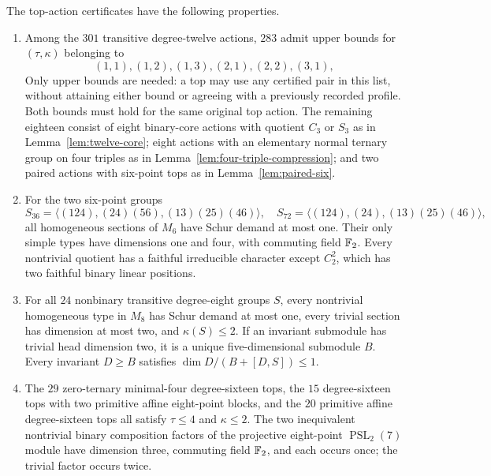 \begin{lemma}\label{lem:small-pair-data}
The top-action certificates have the following properties.
\begin{enumerate}[label=(\roman*)]
\item Among the $301$ transitive degree-twelve actions, $283$ admit
upper bounds for $(\tau,\kappa)$ belonging to
\[
 (1,1),(1,2),(1,3),(2,1),(2,2),(3,1),
\]
Only upper bounds are needed: a top may use any certified pair in this
list, without attaining either bound or agreeing with a previously
recorded profile. Both bounds must hold for the same original top action.
The remaining eighteen consist of eight binary-core actions with
quotient $C_3$ or $S_3$ as in Lemma~\ref{lem:twelve-core}; eight actions
with an elementary normal ternary group on four triples as in
Lemma~\ref{lem:four-triple-compression}; and two paired actions with
six-point tops as in Lemma~\ref{lem:paired-six}.
\item For the two six-point groups
\[
 S_{36}=\langle(124),(24)(56),(13)(25)(46)\rangle,
 \quad
 S_{72}=\langle(124),(24),(13)(25)(46)\rangle,
\]
all homogeneous sections of $M_6$ have Schur demand at most one.
Their only simple types have dimensions one and four, with commuting
field $\mathbb F_2$. Every nontrivial quotient has a faithful irreducible
character except $C_2^2$, which has two faithful binary linear positions.
\item For all $24$ nonbinary transitive degree-eight groups $S$, every
nontrivial homogeneous type in $M_8$ has Schur demand at most one,
every trivial section has dimension at most two, and $\kappa(S)\leq2$.
If an invariant submodule has trivial head dimension two, it is a
unique five-dimensional submodule $B$. Every invariant $D\geq B$
satisfies $\dim D/(B+[D,S])\leq1$.
\item The $29$ zero-ternary minimal-four degree-sixteen tops, the $15$
degree-sixteen tops with two primitive affine eight-point blocks, and
the $20$ primitive affine degree-sixteen tops all satisfy
$\tau\leq4$ and $\kappa\leq2$.
The two inequivalent nontrivial binary composition factors of the
projective eight-point $\operatorname{PSL}_2(7)$ module have dimension
three, commuting field $\mathbb F_2$, and each occurs once; the trivial factor
occurs twice.
\end{enumerate}
\end{lemma}
